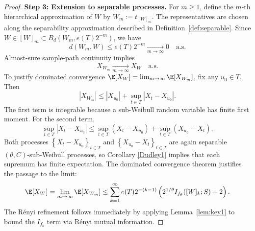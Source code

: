 \documentclass[11pt]{article}
\begin{document}
\begin{proof}
\textbf{Step 3: Extension to separable processes.}
For $m\ge 1$, define the $m$-th hierarchical approximation of $W$ by
$W_m:=t_{[W]_m}$. The representatives are chosen along the separability
approximation described in Definition~\ref{def:separable}. Since
$W\in[W]_m\subset B_d(W_m,e(T)2^{-m})$, we have
\[
d(W_m,W)\le e(T)2^{-m}\xrightarrow[m\to\infty]{}0
\quad\text{a.s.}
\]
Almost-sure sample-path continuity
 implies
\[
X_{W_m}\xrightarrow[m\to\infty]{}X_W
\quad\text{a.s.}
\]
To justify dominated convergence $\E[X_W] = \lim_{m \to \infty} \E[X_{W_m}]$, fix any $u_0 \in T$. Then
$$
\left|X_{W_m}\right| \leq\left|X_{u_0}\right|+\sup _{t \in T}\left|X_t-X_{u_0}\right| .
$$
The first term is integrable because a sub-Weibull random variable has finite first moment. For the second term,
$$
\sup _{t \in T}\left|X_t-X_{u_0}\right| \leq \sup _{t \in T}\left(X_t-X_{u_0}\right)+\sup _{t \in T}\left(X_{u_0}-X_t\right) .
$$
Both processes
$\left\{X_t-X_{u_0}\right\}_{t \in T}$ and $\left\{X_{u_0}-X_t\right\}_{t \in T}
$ are again separable $(\theta, C)$-sub-Weibull processes, so Corollary \ref{Dudley1} implies that each supremum has finite expectation. The dominated convergence theorem justifies the passage to the limit:
\[
    \E[X_W] = \lim_{m \to \infty} \E[X_{W_m}] \le \sum_{k=1}^\infty e(T)2^{-(k-1)} \left( 2^{1/\theta} I_{f_\theta}([W]_k; S) + 2 \right).
\]
	The R\'enyi refinement follows immediately by applying Lemma~\ref{lem:key1} to bound the $I_{f_\theta}$ term via R\'enyi mutual information.
\end{proof}






\end{document}
